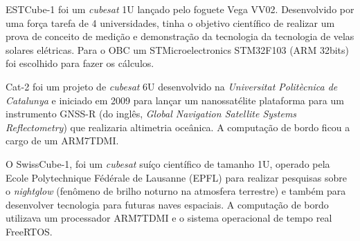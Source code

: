 ESTCube-1 \cite{estcube1_ref} foi um \textit{cubesat} 1U lançado pelo foguete Vega VV02. Desenvolvido por uma força tarefa de 4 universidades, tinha o objetivo científico de realizar um prova de conceito de medição e demonstração da tecnologia da tecnologia de velas solares elétricas. Para o OBC um STMicroelectronics STM32F103 (ARM 32bits) foi escolhido para fazer os cálculos.

Cat-2 \cite{cat2_ref} foi um projeto de \textit{cubesat} 6U desenvolvido na \textit{Universitat Politècnica de Catalunya} e iniciado em 2009 para lançar um nanossatélite plataforma para um instrumento GNSS-R (do inglês, \textit{Global Navigation Satellite Systems Reflectometry}) que realizaria altimetria oceânica. A computação de bordo ficou a cargo de um ARM7TDMI.  

O SwissCube-1, \cite{swisscube_ref} foi um \textit{cubesat} suíço científico de tamanho 1U, operado pela Ecole Polytechnique Fédérale de Lausanne (EPFL) para realizar pesquisas sobre o \textit{nightglow} (fenômeno de brilho   noturno na atmosfera terrestre) e também para desenvolver tecnologia para futuras naves espaciais. A  computação  de  bordo utilizava um processador ARM7TDMI e o sistema operacional de tempo real FreeRTOS.





